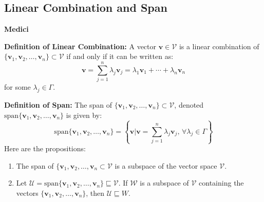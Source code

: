 \documentclass{article}
\newcommand{\spann}[1]{\mathrm{span}\{#1\}}
\begin{document}
    \subsection{Linear Combination and Span}
    \begin{minipage}[t]{.45\textwidth} %
        \begin{center}
            \textbf{Medici}
        \end{center}
        \textbf{Definition of Linear Combination:} A vector $\bm{v} \in \mathcal{V}$ is a linear combination of $\{\bm{v}_1, \bm{v}_2, \dots, \bm{v}_n\} \subset \mathcal{V}$ if and only if it can be written as:
        \begin{equation*}
            \bm{v} = \sum_{j=1}^n \lambda_j \bm{v}_j = \lambda_1\bm{v}_1 + \cdots + \lambda_n \bm{v}_n
        \end{equation*}
        for some $\lambda_j \in \Gamma$.
        \vspace{2mm}

        \textbf{Definition of Span:} The span of $\{\bm{v}_1,\bm{v}_2, \dots, \bm{v}_n\} \subset \mathcal{V}$, denoted $\spann{\bm{v}_1,\bm{v}_2,\dots,\bm{v}_n}$ is given by:
        \begin{equation*}
            \spann{\bm{v}_1,\bm{v}_2,\dots,\bm{v}_n} = \left\{\bm{v} \Biggr| \bm{v} = \sum_{j=1}^n \lambda_j\bm{v}_j,\, \forall \lambda_j \in \Gamma\right\}
        \end{equation*}
        Here are the propositions:
        \vspace{2mm}

        \begin{enumerate}[label = \textbf{Prop \Roman*.}, leftmargin=16mm]
            \item The span of $\{\bm{v}_1,\bm{v}_2,\dots,\bm{v}_n \subset \mathcal{V}$ is a subspace of the vector space $\mathcal{V}$. 
            \item Let $\mathcal{U} = \spann{\bm{v}_1,\bm{v}_2,\dots,\bm{v}_n} \sqsubseteq \mathcal{V}$. If $\mathcal{W}$ is a subspace of $\mathcal{V}$ containing the vectors $\{\bm{v}_1,\bm{v}_2,\dots,\bm{v}_n\}$, then $\mathcal{U} \sqsubseteq W$.
        \end{enumerate}
    \end{minipage}
    \hfill
\end{document}
